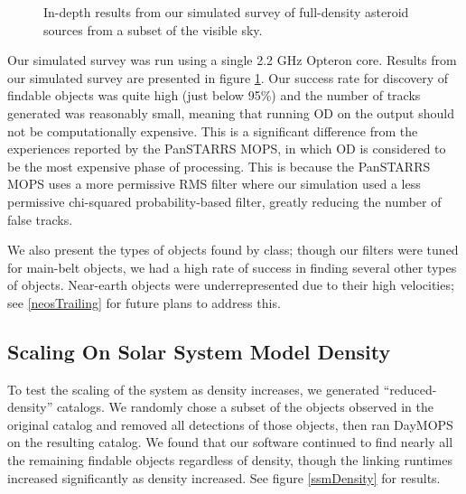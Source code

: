 \documentclass[12pt,preprint]{aastex}
\begin{document}
\begin{figure}[ht!]
\caption{In-depth results from our simulated survey of full-density asteroid sources from a subset of the visible sky.}
\label{bigSimResults}
\end{figure}

Our simulated survey was run using a single 2.2 GHz Opteron core.
Results from our simulated survey are presented in figure
\ref{bigSimResults}.  Our success rate for discovery of findable
objects was quite high (just below 95\%) and the number of tracks
generated was reasonably small, meaning that running OD on the output
should not be computationally expensive.  This is a significant
difference from the experiences reported by the PanSTARRS MOPS, in
which OD is considered to be the most expensive phase of processing.
This is because the PanSTARRS MOPS uses a more permissive RMS filter
where our simulation used a less permissive chi-squared
probability-based filter, greatly reducing the number of false tracks.

We also present the types of objects found by class; though our
filters were tuned for main-belt objects, we had a high rate of
success in finding several other types of objects.  Near-earth objects
were underrepresented due to their high velocities; see
\ref{neosTrailing} for future plans to address this.



\subsection{Scaling On Solar System Model Density}

To test the scaling of the system as density increases, we generated
``reduced-density'' catalogs.  We randomly chose a subset of the
objects observed in the original catalog and removed all detections of
those objects, then ran DayMOPS on the resulting catalog.  We found
that our software continued to find nearly all the remaining findable objects
regardless of density, though the linking runtimes increased
significantly as density increased. See figure \ref{ssmDensity} for
results.
\end{document}

